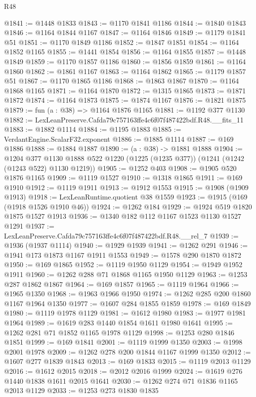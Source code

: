 \begin{lexlean}{R48}
\begin{coremodule}
@1841 := @1448 @1833
@1843 := @1170 @1841 @1186
@1844 := @1840 @1843
@1846 := @1164 @1844 @1167
@1847 := @1164 @1846
@1849 := @1179 @1841 @51
@1851 := @1170 @1849 @1186
@1852 := @1847 @1851
@1854 := @1164 @1852 @1165
@1855 := @1441 @1854
@1856 := @1164 @1855
@1857 := @1448 @1849
@1859 := @1170 @1857 @1186
@1860 := @1856 @1859
@1861 := @1164 @1860
@1862 := @1861 @1167
@1863 := @1164 @1862
@1865 := @1179 @1857 @51
@1867 := @1170 @1865 @1186
@1868 := @1863 @1867
@1870 := @1164 @1868 @1165
@1871 := @1164 @1870
@1872 := @1315 @1865
@1873 := @1871 @1872
@1874 := @1164 @1873
@1875 := @1874 @1167
@1876 := @1821 @1875
@1879 := fun (a : @38) => @1164 @1876 @1165
@1881 := @1192 @377 @1130
@1882 := LexLeanPreserve.Cafda79c757163ffe4c6f07f487422bdf.R48.__fits_11
@1883 := @1882 @1114
@1884 := @1195 @1883
@1885 := VerdantEngine.ScalarF32.exponent
@1886 := @1885 @1114
@1887 := @169 @1886
@1888 := @1884 @1887
@1890 := (a : @38) -> @1881 @1888
@1904 := @1204
    @377
    @1130
    @1888
    @522
    @1220
    (@1225 (@1235 @377))
    (@1241 (@1242 (@1243 @522) @1130 @1219))
@1905 := @1252 @403
@1908 := @1905 @520 @1876 @1165
@1909 := @1119 @1527
@1910 := @1318 @1865
@1911 := @169 @1910
@1912 := @1119 @1911
@1913 := @1912 @1553
@1915 := @1908 (@1909 @1913)
@1918 := LexLeanRuntime.quotient @38 @1559
@1923 := @1915 (@169 (@1918 @1526 @1910 @46))
@1924 := @1262 @184
@1929 := @1924 @519 @1820 @1875 @1527 @1913
@1936 := @1340 @182 @112 @1167 @1523 @1130 @1527 @1291
@1937 := LexLeanPreserve.Cafda79c757163ffe4c6f07f487422bdf.R48.__rel_7
@1939 := @1936 (@1937 @1114)
@1940 := @1929 @1939
@1941 := @1262 @291
@1946 := @1941 @173 @1873 @1167 @1911 @1553
@1949 := @1578 @290 @1870 @1872
@1950 := @169 @1865
@1952 := @1119 @1950 @1129
@1954 := @1949 @1952 @1911
@1960 := @1262 @288 @71 @1868 @1165 @1950 @1129
@1963 := @1253 @287 @1862 @1867
@1964 := @169 @1857
@1965 := @1119 @1964
@1966 := @1965 @1350
@1968 := @1963 @1966 @1950
@1974 := @1262 @285 @200 @1860 @1167 @1964 @1350
@1977 := @1607 @284 @1855 @1859
@1978 := @169 @1849
@1980 := @1119 @1978 @1129
@1981 := @1612 @1980
@1983 := @1977 @1981 @1964
@1989 := @1619 @283 @1440 @1854 @1611 @1980 @1641
@1995 := @1262 @281 @71 @1852 @1165 @1978 @1129
@1998 := @1253 @280 @1846 @1851
@1999 := @169 @1841
@2001 := @1119 @1999 @1350
@2003 := @1998 @2001 @1978
@2009 := @1262 @278 @200 @1844 @1167 @1999 @1350
@2012 := @1607 @277 @1839 @1843
@2013 := @169 @1833
@2015 := @1119 @2013 @1129
@2016 := @1612 @2015
@2018 := @2012 @2016 @1999
@2024 := @1619 @276 @1440 @1838 @1611 @2015 @1641
@2030 := @1262 @274 @71 @1836 @1165 @2013 @1129
@2033 := @1253 @273 @1830 @1835

\end{coremodule}
\end{lexlean}
